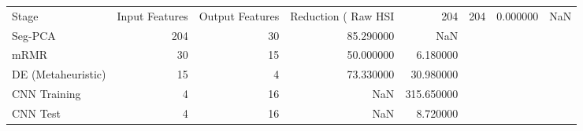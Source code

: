 \begin{tabular}{lrrrr}
\toprule
Stage & Input Features & Output Features & Reduction (%
\midrule
Raw HSI & 204 & 204 & 0.000000 & NaN \\
Seg-PCA & 204 & 30 & 85.290000 & NaN \\
mRMR & 30 & 15 & 50.000000 & 6.180000 \\
DE (Metaheuristic) & 15 & 4 & 73.330000 & 30.980000 \\
CNN Training & 4 & 16 & NaN & 315.650000 \\
CNN Test & 4 & 16 & NaN & 8.720000 \\
\bottomrule
\end{tabular}
